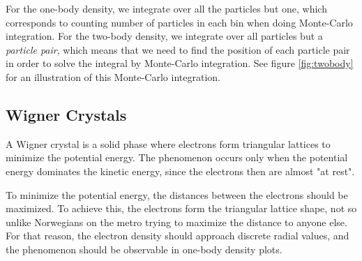 For the one-body density, we integrate over all the particles but one, which corresponds to counting number of particles in each bin when doing Monte-Carlo integration. For the two-body density, we integrate over all particles but a \textit{particle pair}, which means that we need to find the position of each particle pair in order to solve the integral by Monte-Carlo integration. See figure \eqref{fig:twobody} for an illustration of this Monte-Carlo integration.

\subsection{Wigner Crystals} \label{sec:wigner}
A Wigner crystal is a solid phase where electrons form triangular lattices to minimize the potential energy. The phenomenon occurs only when the potential energy dominates the kinetic energy, since the electrons then are almost "at rest". 

To minimize the potential energy, the distances between the electrons should be maximized. To achieve this, the electrons form the triangular lattice shape, not so unlike Norwegians on the metro trying to maximize the distance to anyone else. For that reason, the electron density should approach discrete radial values, and the phenomenon should be observable in one-body density plots.



